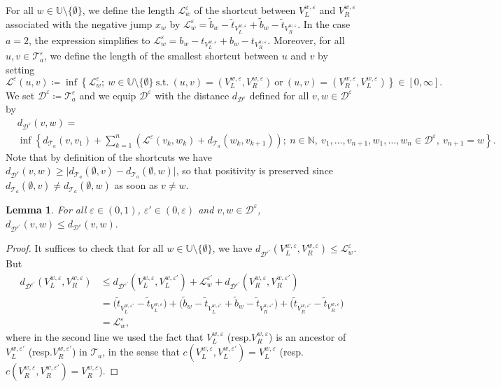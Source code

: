 \documentclass[11pt]{article}
\newtheorem{lemma}[theorem]{Lemma}
\numberwithin{equation}{section}
\def\vp{\varepsilon}
\def \N{\mathbb{N}}
\def \U{\mathbb{U}}
\def \T{\mathcal{T}}
\begin{document}
For all $w \in \U \setminus \{\emptyset\}$, we define the length $\mathcal{L}^\vp_w$ of the shortcut between $V^{w,\vp}_L$ and $V^{w,\vp}_R$ associated with the negative jump $x_w$ by
$
\mathcal{L}^\vp_w
=\widetilde{b}_w-\widetilde{t}_{V_L^{w,\vp}} +\widetilde{b}_w-\widetilde{t}_{V_R^{w,\vp}}
$. 
In the case $a=2$, the expression simplifies to $\mathcal{L}^\vp_w = b_w-t_{V_L^{w,\vp}} +b_w-t_{V_R^{w,\vp}}$. Moreover, for all $u,v \in \T_a^\vp$, we define the length of the smallest shortcut between $u$ and $v$ by setting
$$
\mathcal{L}^\vp(u,v) \coloneqq \inf \left\{\mathcal{L}^\vp_w ; \ w \in \U\setminus \{\emptyset\} \  \text{s.t.} \ (u,v)= (V^{w,\vp}_L, V^{w,\vp}_R) \ \text{or} \ (u,v) = (V^{w,\vp}_R,V^{w,\vp}_L) \right\}
\in [0,\infty].
$$
We set $\mathcal{D}^\vp \coloneqq \T_a^\vp$ and we equip $\mathcal{D}^\vp$ with the distance $d_{\mathcal{D}^\vp}$ defined for all $v,w \in \mathcal{D}^\vp$ by
\begin{align*}
	&d_{\mathcal{D}^\vp}(v,w)=\\
	&\inf\left\{ d_{\T_a}(v,v_1) + \sum_{k=1}^n \left( \mathcal{L}^\vp(v_k,w_k)+ d_{\T_a}(w_k,v_{k+1}) \right); \ 
	n\in \N, \
	v_1,\ldots, v_{n+1}, w_1,\ldots, w_{n} \in \mathcal{D}^\vp, \
	v_{n+1}=w
	\right\}.
\end{align*}
Note that by definition of the shortcuts we have $d_{\mathcal{D}^\vp}(v,w) \ge \vert d_{\T_a} (\emptyset,v)- d_{\T_a} (\emptyset, w) \vert$, so that positivity is preserved since $d_{\T_a} (\emptyset,v)\neq d_{\T_a} (\emptyset, w)$ as soon as $v \neq w$.
\begin{lemma}
	For all $\vp \in (0,1)$, $\vp' \in (0,\vp)$ and $v,w \in \mathcal{D}^\vp$, $
	d_{\mathcal{D}^{\vp'}}(v,w)\le d_{\mathcal{D}^{\vp}}(v,w).
	$
\end{lemma}
\begin{proof}
	It suffices to check that for all $w\in \U\setminus \{\emptyset\}$, we have $d_{\mathcal{D}^{\vp'}}(V^{w,\vp}_L, V^{w,\vp}_R) \le \mathcal{L}^\vp_w$. But 
	\begin{align*}
		d_{\mathcal{D}^{\vp'}}(V^{w,\vp}_L, V^{w,\vp}_R)
		&\le
		d_{\mathcal{D}^{\vp'}}(V^{w,\vp}_L, V^{w,\vp'}_L)
		+ \mathcal{L}^{\vp'}_w
		+ d_{\mathcal{D}^{\vp'}}(V^{w,\vp}_R, V^{w,\vp'}_R) 
		\\
		&=
		\big(\widetilde{t}_{V_L^{w,\vp'}}-\widetilde{t}_{V_L^{w,\vp}}\big)
		+
		\big(\widetilde{b}_w -\widetilde{t}_{V_L^{w,\vp'}}
		+ \widetilde{b}_w - \widetilde{t}_{V^{w,\vp'}_R}\big)
		+
		\big(\widetilde{t}_{V_R^{w,\vp'}}-\widetilde{t}_{V_R^{w,\vp}}\big)
		\\
		&=\mathcal{L}^\vp_w,
	\end{align*}
	where in the second line we used the fact that $V_L^{w,\vp}$ (resp.\@ $V_R^{w,\vp}$) is an ancestor of $V_L^{w,\vp'}$ (resp.\@ $V_R^{w,\vp'}$) in $\T_a$, in the sense that $c(V_L^{w,\vp}, V_L^{w,\vp'})= V_L^{w,\vp}$ (resp.\@ $c(V_R^{w,\vp}, V_R^{w,\vp'})= V_R^{w,\vp}$).
\end{proof}
\end{document}
